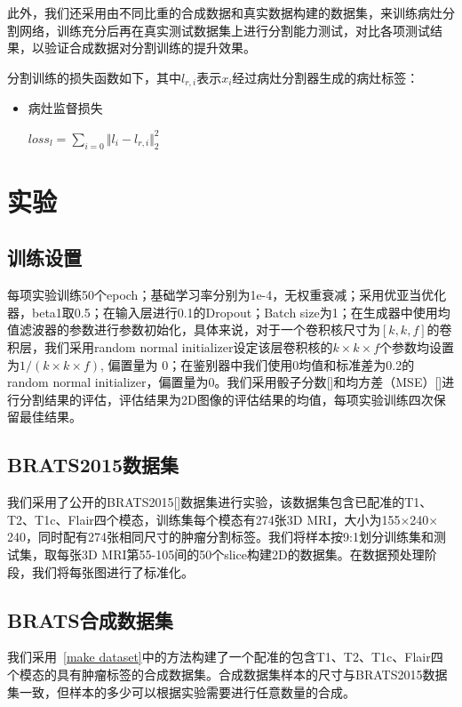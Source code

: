 \documentclass[letterpaper]{article} %
\begin{document}
此外，我们还采用由不同比重的合成数据和真实数据构建的数据集，来训练病灶分割网络，训练充分后再在真实测试数据集上进行分割能力测试，对比各项测试结果，以验证合成数据对分割训练的提升效果。

分割训练的损失函数如下，其中$l_{r,i}$表示$x_i$经过病灶分割器生成的病灶标签：

\begin{itemize}
	\item 病灶监督损失

	\begin{center}
		$loss_{l}=\sum\limits_{i=0}\Vert{l_i-l_{r,i}}\Vert_{2}^{2}$
	\end{center}
	
\end{itemize}

\section{实验}
\subsection{训练设置}
每项实验训练50个epoch；基础学习率分别为1e-4，无权重衰减；采用优亚当优化器，beta1取0.5；在输入层进行0.1的Dropout；Batch size为1；在生成器中使用均值滤波器的参数进行参数初始化，具体来说，对于一个卷积核尺寸为$[k,k,f]$的卷积层，我们采用random normal initializer设定该层卷积核的$k\times k\times f$个参数均设置为$1/(k\times k\times f)$, 偏置量为 0；在鉴别器中我们使用0均值和标准差为0.2的random normal initializer，偏置量为0。我们采用骰子分数[]和均方差（MSE）[]进行分割结果的评估，评估结果为2D图像的评估结果的均值，每项实验训练四次保留最佳结果。

\subsection{BRATS2015数据集}
我们采用了公开的BRATS2015[]数据集进行实验，该数据集包含已配准的T1、T2、T1c、Flair四个模态，训练集每个模态有274张3D MRI，大小为155$\times$240$\times$240，同时配有274张相同尺寸的肿瘤分割标签。我们将样本按9:1划分训练集和测试集，取每张3D MRI第55-105间的50个slice构建2D的数据集。在数据预处理阶段，我们将每张图进行了标准化。

\subsection{BRATS合成数据集}
我们采用~\ref{make dataset}中的方法构建了一个配准的包含T1、T2、T1c、Flair四个模态的具有肿瘤标签的合成数据集。合成数据集样本的尺寸与BRATS2015数据集一致，但样本的多少可以根据实验需要进行任意数量的合成。
\end{document}
